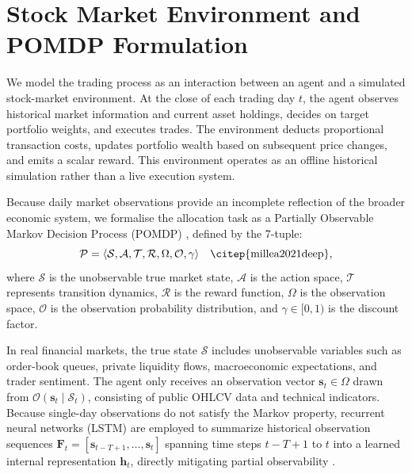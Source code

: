 \section{Stock Market Environment and POMDP Formulation}
\label{sec:stock_market_env}
We model the trading process as an interaction between an agent and a simulated stock-market environment. At the close of each trading day $t$, the agent observes historical market information and current asset holdings, decides on target portfolio weights, and executes trades. The environment deducts proportional transaction costs, updates portfolio wealth based on subsequent price changes, and emits a scalar reward. This environment operates as an offline historical simulation rather than a live execution system.

Because daily market observations provide an incomplete reflection of the broader economic system, we formalise the allocation task as a Partially Observable Markov Decision Process (POMDP) \citep{millea2021deep}, defined by the 7-tuple:
\begin{equation}
\mathcal{P} = \langle \mathcal{S}, \mathcal{A}, \mathcal{T}, \mathcal{R}, \Omega, \mathcal{O}, \gamma \rangle \quad \text{\citep{millea2021deep}},
\end{equation}
where $\mathcal{S}$ is the unobservable true market state, $\mathcal{A}$ is the action space, $\mathcal{T}$ represents transition dynamics, $\mathcal{R}$ is the reward function, $\Omega$ is the observation space, $\mathcal{O}$ is the observation probability distribution, and $\gamma \in [0, 1)$ is the discount factor.

In real financial markets, the true state $\mathcal{S}$ includes unobservable variables such as order-book queues, private liquidity flows, macroeconomic expectations, and trader sentiment. The agent only receives an observation vector $\mathbf{s}_t \in \Omega$ drawn from $\mathcal{O}(\mathbf{s}_t \mid \mathcal{S}_t)$, consisting of public OHLCV data and technical indicators. Because single-day observations do not satisfy the Markov property, recurrent neural networks (LSTM) are employed to summarize historical observation sequences $\mathbf{F}_t = [\mathbf{s}_{t-T+1}, \dots, \mathbf{s}_t]$ spanning time steps $t-T+1$ to $t$ into a learned internal representation $\mathbf{h}_t$, directly mitigating partial observability \citep{zou2024novel}.

